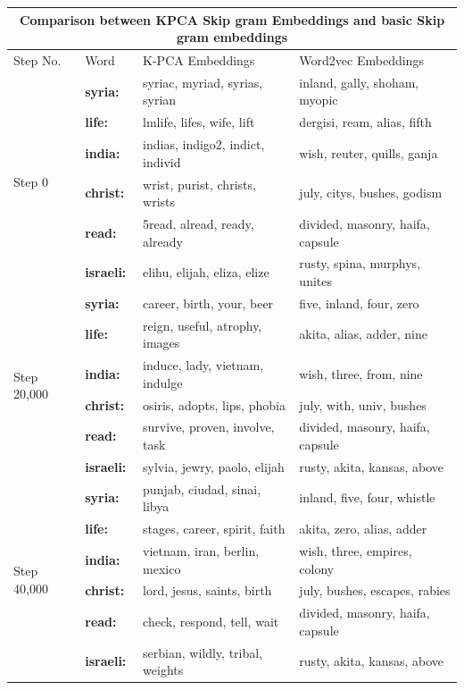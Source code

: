 \begin{table}
	\hskip-0.5cm
	\begin{tabular}[htbp]{|l|l|l|l|}	
		\hline
		\multicolumn{4}{|c|}{\textbf{Comparison between KPCA Skip gram Embeddings and basic Skip gram embeddings}} \\
		\hline
		Step No.&Word&K-PCA Embeddings& Word2vec Embeddings\\ \hline
		\multirow{6}{*}{Step 0}
		&\textbf{syria:}& syriac, myriad, syrias, syrian&inland, gally, shoham, myopic\\
		&\textbf{life:}& lmlife, lifes, wife, lift&dergisi, ream, alias, fifth\\
		&\textbf{india:}& indias, indigo2, indict, individ&wish, reuter, quills, ganja\\
		&\textbf{christ:}& wrist, purist, christs, wrists&july, citys, bushes, godism\\
		&\textbf{read:}& 5read, alread, ready, already&divided, masonry, haifa, capsule\\
		&\textbf{israeli:}& elihu, elijah, eliza, elize&rusty, spina, murphys, unites\\ 
		\hline
		\multirow{6}{*}{Step 20,000}
		&\textbf{syria:}& career, birth, your, beer&five, inland, four, zero\\
		&\textbf{life:}& reign, useful, atrophy, images&akita, alias, adder, nine\\
		&\textbf{india:}& induce, lady, vietnam, indulge&wish, three, from, nine\\
		&\textbf{christ:}& osiris, adopts, lips, phobia&july, with, univ, bushes\\
		&\textbf{read:}& survive, proven, involve, task&divided, masonry, haifa, capsule\\
		&\textbf{israeli:}& sylvia, jewry, paolo, elijah&rusty, akita, kansas, above\\ 
		\hline
		\multirow{6}{*}{Step 40,000} 
		&\textbf{syria:}& punjab, ciudad, sinai, libya&inland, five, four, whistle\\
		&\textbf{life:}& stages, career, spirit, faith&akita, zero, alias, adder\\
		&\textbf{india:}& vietnam, iran, berlin, mexico&wish, three, empires, colony\\
		&\textbf{christ:}& lord, jesus, saints, birth&july, bushes, escapes, rabies\\
		&\textbf{read:}& check, respond, tell, wait&divided, masonry, haifa, capsule\\
		&\textbf{israeli:}& serbian, wildly, tribal, weights&rusty, akita, kansas, above\\

\end{tabular}
\end{table}

